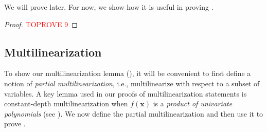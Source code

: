 \documentclass[11pt]{article}
\begin{document}
\noindent
We will prove  later. For now, we show how it is useful in proving .

\begin{proof}\textcolor{red}{TOPROVE 9}\end{proof}

\subsection{Multilinearization}
 To show our multilinearization lemma (), it will be convenient to first define a notion of \emph{partial multilinearization}, i.e., multilinearize with respect to a subset of variables. A key lemma used in our proofs of multilinearization statements is constant-depth multilinearization when $f(\mathbf{x})$ is a \emph{product of univariate polynomials} (see ). We now define the partial multilinearization and then use it to prove .\\
\end{document}
